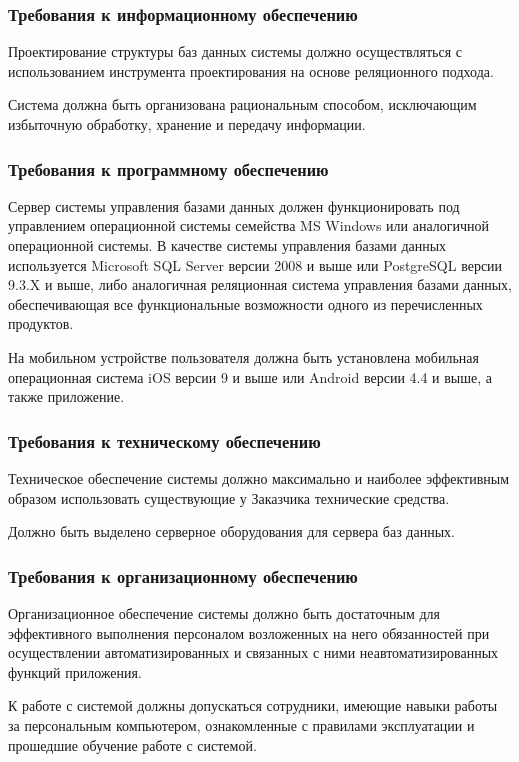 \documentclass[14pt]{extreport}
\begin{document}
\subsubsection{Требования к информационному обеспечению}
Проектирование структуры баз данных системы должно осуществляться с использованием инструмента проектирования на основе реляционного подхода.

Система должна быть организована рациональным способом, исключающим избыточную обработку, хранение и передачу информации.

\subsubsection{Требования к программному обеспечению}
Сервер системы управления базами данных должен функционировать под управлением операционной системы семейства MS Windows или аналогичной операционной системы. В качестве системы управления базами данных  используется Microsoft SQL Server версии 2008 и выше или PostgreSQL версии 9.3.X и выше, либо аналогичная реляционная система управления базами данных, обеспечивающая все функциональные возможности одного из перечисленных продуктов.

На мобильном устройстве пользователя должна быть установлена мобильная операционная система iOS версии 9 и выше или Android версии 4.4 и выше, а также приложение. 

\subsubsection{Требования к техническому обеспечению}
Техническое обеспечение системы должно максимально и наиболее эффективным образом использовать существующие у Заказчика технические средства.

Должно быть выделено серверное оборудования для сервера баз данных.

\subsubsection{Требования к организационному обеспечению}
Организационное обеспечение системы должно быть достаточным для эффективного выполнения персоналом возложенных на него обязанностей при осуществлении автоматизированных и связанных с ними неавтоматизированных функций приложения.

К работе с системой должны допускаться сотрудники, имеющие навыки работы за персональным компьютером, ознакомленные с правилами эксплуатации и прошедшие обучение работе с системой.
\end{document}
